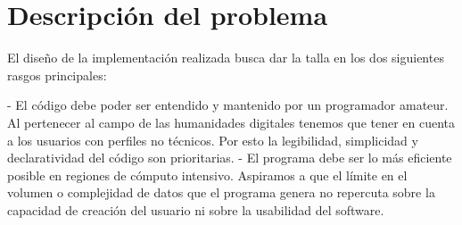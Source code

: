 \chapter{Descripción del problema}

El diseño de la implementación realizada busca dar la talla en los dos siguientes rasgos principales:

 - El código debe poder ser entendido y mantenido por un programador amateur. Al pertenecer al campo de las humanidades digitales tenemos que tener en cuenta a los usuarios con perfiles no técnicos. Por esto la legibilidad, simplicidad y declaratividad del código son prioritarias.
 - El programa debe ser lo más eficiente posible en regiones de cómputo intensivo. Aspiramos a que el límite en el volumen o complejidad de datos que el programa genera no repercuta sobre la capacidad de creación del usuario ni sobre la usabilidad del software.

